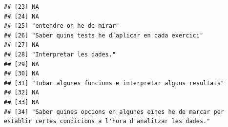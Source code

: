 \documentclass[
]{article}
\begin{document}
\begin{verbatim}
## [23] NA                                                                                                                                                                                                                             
## [24] NA                                                                                                                                                                                                                             
## [25] "entendre on he de mirar"                                                                                                                                                                                                      
## [26] "Saber quins tests he d’aplicar en cada exercici"                                                                                                                                                                              
## [27] NA                                                                                                                                                                                                                             
## [28] "Interpretar les dades."                                                                                                                                                                                                       
## [29] NA                                                                                                                                                                                                                             
## [30] NA                                                                                                                                                                                                                             
## [31] "Tobar algunes funcions e interpretar alguns resultats"                                                                                                                                                                        
## [32] NA                                                                                                                                                                                                                             
## [33] NA                                                                                                                                                                                                                             
## [34] "Saber quines opcions en algunes eïnes he de marcar per establir certes condicions a l'hora d'analitzar les dades."                                                                                                            

\end{verbatim}
\end{document}
